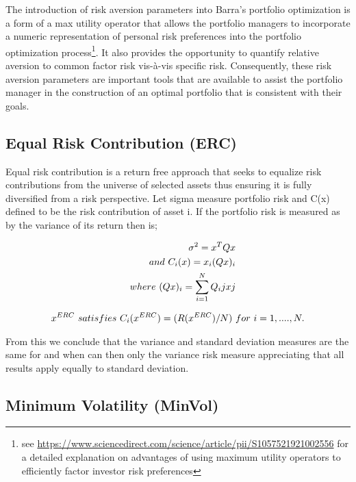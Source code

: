 \documentclass[11pt,preprint, authoryear]{elsarticle}
\numberwithin{equation}{section}
\numberwithin{figure}{section}
\numberwithin{table}{section}
\let\rmarkdownfootnote\footnote%
\def\footnote{\protect\rmarkdownfootnote}
\begin{document}
The introduction of risk aversion parameters into Barra's portfolio
optimization is a form of a max utility operator that allows the
portfolio managers to incorporate a numeric representation of personal
risk preferences into the portfolio optimization process\footnote{see
  \url{https://www.sciencedirect.com/science/article/pii/S1057521921002556}
  for a detailed explanation on advantages of using maximum utility
  operators to efficiently factor investor risk preferences}. It also
provides the opportunity to quantify relative aversion to common factor
risk vis-à-vis specific risk. Consequently, these risk aversion
parameters are important tools that are available to assist the
portfolio manager in the construction of an optimal portfolio that is
consistent with their goals.

\hypertarget{equal-risk-contribution-erc}{%
\subsection{Equal Risk Contribution
(ERC)}\label{equal-risk-contribution-erc}}

Equal risk contribution is a return free approach that seeks to equalize
risk contributions from the universe of selected assets thus ensuring it
is fully diversified from a risk perspective. Let sigma measure
portfolio risk and C(x) defined to be the risk contribution of asset i.
If the portfolio risk is measured as by the variance of its return then
is;

\begin{align}
\sigma^2 = x^TQ{x}\\ and \ C_i(x)= x_i(Qx)_i \\ \notag
\quad where\ (Qx)_i =\sum_{i = 1}^{N}Q_ijxj \notag
\end{align}

\begin{align}
x^{ERC} \ satisfies \ C_i(x^{ERC}) = (R(x^{ERC})/N) \ for \ i = 1,...., N. \notag
\end{align}

From this we conclude that the variance and standard deviation measures
are the same for and when can then only the variance risk measure
appreciating that all results apply equally to standard deviation.

\hypertarget{minimum-volatility-minvol}{%
\subsection{Minimum Volatility
(MinVol)}\label{minimum-volatility-minvol}}
\end{document}
